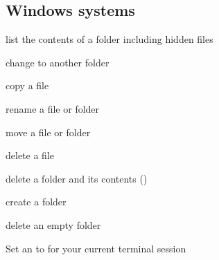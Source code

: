 \ignorespaces 

\subsection{Windows systems}
\label{\detokenize{intro/howto:windows-systems}}\label{\detokenize{intro/howto:index-3}}\begin{description}
\sphinxAtStartPar
list the contents of a folder including hidden files

\sphinxAtStartPar
change to another folder

\sphinxAtStartPar
copy a file

\sphinxAtStartPar
rename a file or folder

\sphinxAtStartPar
move a file or folder

\sphinxAtStartPar
delete a file

\sphinxAtStartPar
delete a folder and its contents ()

\sphinxAtStartPar
create a folder

\sphinxAtStartPar
delete an empty folder

\sphinxAtStartPar
Set an {\hyperref[\detokenize{glossary:term-environment-variable}]{}}  to  for your current terminal session

\end{description}


